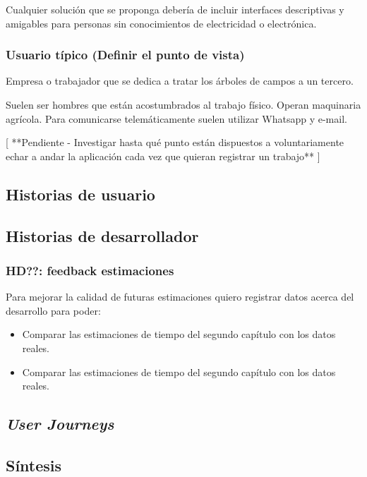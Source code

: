 Cualquier solución que se proponga debería de incluir interfaces
descriptivas y amigables para personas sin conocimientos de
electricidad o electrónica.

\subsubsection{Usuario típico (Definir el punto de vista)}

Empresa o trabajador que se dedica a tratar los árboles de campos a un tercero.

Suelen ser hombres que están acostumbrados al trabajo físico. Operan maquinaria
agrícola. Para comunicarse telemáticamente suelen utilizar Whatsapp y e-mail.

[ **Pendiente - Investigar hasta qué punto están dispuestos a voluntariamente
echar a andar la aplicación cada vez que quieran registrar un trabajo** ]

\subsection{Historias de usuario}

\subsection{Historias de desarrollador}

\subsubsection{HD??: feedback estimaciones}
Para mejorar la calidad de futuras estimaciones quiero registrar datos acerca del desarrollo
para poder:

\begin{itemize}
   \item Comparar las estimaciones de tiempo del segundo capítulo con los datos reales.
   \item Comparar las estimaciones de tiempo del segundo capítulo con los datos reales.
\end{itemize}

\subsection{\textit{User Journeys}}

\subsection{Síntesis}

